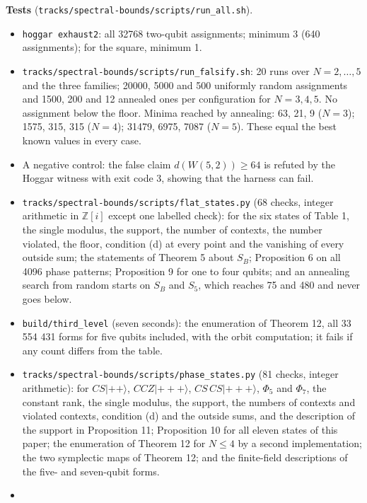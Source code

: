 \documentclass[11pt,a4paper]{article}
\providecommand{\tightlist}{\setlength{\itemsep}{0pt}\setlength{\parskip}{0pt}}
\begin{document}
\textbf{Tests} (\nolinkurl{tracks/spectral-bounds/scripts/run_all.sh}).

\begin{itemize}
\tightlist
\item
  \texttt{hoggar\ exhaust2}: all 32768 two-qubit assignments; minimum 3 (640 assignments); for the square,
  minimum 1.
\item
  \nolinkurl{tracks/spectral-bounds/scripts/run_falsify.sh}: 20 runs over \(N = 2, \dots, 5\) and the three families; 20000, 5000 and 500
  uniformly random assignments and 1500, 200 and 12 annealed ones per configuration for
  \(N = 3, 4, 5\). No assignment below the floor. Minima reached by annealing: 63, 21, 9 (\(N=3\));
  1575, 315, 315 (\(N=4\)); 31479, 6975, 7087 (\(N=5\)). These equal the best known values in every case.
\item
  A negative control: the false claim \(d(W(5,2)) \ge 64\) is refuted by the Hoggar witness with exit
  code 3, showing that the harness can fail.
\item
  \nolinkurl{tracks/spectral-bounds/scripts/flat_states.py} (68 checks, integer arithmetic in \(\mathbb{Z}[i]\) except one labelled check):
  for the six states of Table 1, the single modulus, the support, the number of contexts, the number
  violated, the floor, condition (d) at every point and the vanishing of every outside sum; the statements
  of Theorem 5 about \(S_B\); Proposition 6 on all 4096 phase patterns; Proposition 9 for one to four
  qubits; and an annealing search from random starts on \(S_B\) and \(S_5\), which reaches 75 and 480 and
  never goes below.
\item
  \texttt{build/third\_level} (seven seconds): the enumeration of Theorem 12, all 33 554 431 forms for five
  qubits included, with the orbit computation; it fails if any count differs from the table.
\item
  \nolinkurl{tracks/spectral-bounds/scripts/phase_states.py} (81 checks, integer arithmetic): for \(CS|{+}{+}\rangle\), \(CCZ|{+}{+}{+}\rangle\),
  \(CS\,CS|{+}{+}{+}\rangle\), \(\Phi_5\) and \(\Phi_7\), the constant rank, the single modulus, the support, the
  numbers of contexts and violated contexts, condition (d) and the outside sums, and the description of
  the support in Proposition 11; Proposition 10 for all eleven states of this paper; the enumeration of
  Theorem 12 for \(N \le 4\) by a second implementation; the two symplectic maps of Theorem 12; and the
  finite-field descriptions of the five- and seven-qubit forms.
\item

\end{itemize}
\end{document}
